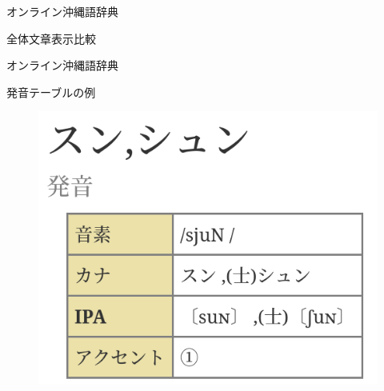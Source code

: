 \documentclass[14pt]{beamer}
\begin{document}
\begin{frame}{オンライン沖縄語辞典}
\begin{block}{全体文章表示比較}
\begin{figure}[ht]
\begin{minipage}{0.5\textwidth}
      \end{minipage}
    \end{figure}
  \end{block}
\end{frame}


\begin{frame}{オンライン沖縄語辞典}
  \begin{block}{発音テーブルの例}
    \begin{figure}[ht]
      \centering
        \includegraphics[height=0.6\paperheight,width=0.6\paperwidth]{okinawago-app-pronunciation-example.png}
    \end{figure}
  \end{block}
\end{frame}
\end{document}
